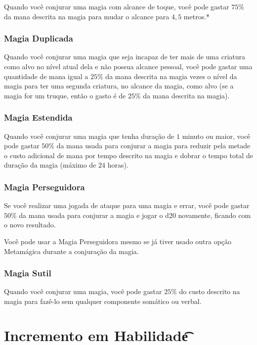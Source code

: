 \documentclass{RPG_Adventure}[2021/10/20]
\begin{document}
Quando você conjurar uma magia com alcance de toque, você pode gastar $75\%$ da
mana descrita na magia para mudar o alcance para $4,5$ metros.*

\subsubsection*{Magia Duplicada}%
\label{ssub:magia_duplicada}

Quando você conjurar uma magia que seja incapaz de ter mais de uma criatura como
alvo no nível atual dela e não possua alcance pessoal, você pode gastar uma
quantidade de mana igual a $25\%$ da mana descrita na magia vezes o nível da
magia para ter uma segunda criatura, no alcance da magia, como alvo (se a magia
for um truque, então o gasto é de $25\%$ da mana descrita na magia).

\subsubsection{Magia Estendida}%
\label{ssub:magia_estendida}

Quando você conjurar uma magia que tenha duração de $1$ minuto ou maior, você
pode gastar $50\%$ da mana usada para conjurar a magia para reduzir pela metade o
custo adicional de mana por tempo descrito na magia e dobrar o tempo total de
duração da magia (máximo de $24$ horas).

\subsubsection*{Magia Perseguidora}%
\label{ssub:magia_perseguidora}

Se você realizar uma jogada de ataque para uma magia e errar, você pode gastar
$50\%$ da mana usada para conjurar a magia e jogar o d20 novamente, ficando com
o novo resultado.

Você pode usar a Magia Perseguidora mesmo se já tiver usado outra opção
Metamágica durante a conjuração da magia.

\subsubsection*{Magia Sutil}%
\label{ssub:magia_sutil}

Quando você conjurar uma magia, você pode gastar $25\%$ do custo descrito na
magia para fazê-lo sem qualquer componente somático ou verbal.

\section*{Incremento em Habilidade\t\t}%
\label{sec:incremento_em_habilidade}
\end{document}
